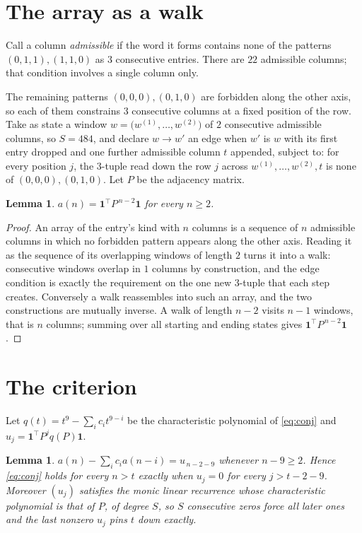 \documentclass[11pt,a4paper]{article}
\theoremstyle{plain}
\newtheorem{lemma}[theorem]{Lemma}
\theoremstyle{definition}
\begin{document}
\section{The array as a walk}

Call a column \emph{admissible} if the word it forms contains none of the patterns
$(0,1,1), (1,1,0)$ as $3$ consecutive entries. There are $22$ admissible columns; that condition
involves a single column only.

The remaining patterns $(0,0,0), (0,1,0)$ are forbidden along the other axis, so each of them
constrains $3$ consecutive columns at a fixed position of the row. Take as state a
window $w=\bigl(w^{(1)},\dots,w^{(2)}\bigr)$ of $2$ consecutive admissible
columns, so $S=484$, and declare $w\to w'$ an edge when $w'$ is $w$ with its first entry
dropped and one further admissible column $t$ appended, subject to: for every position
$j$, the $3$-tuple read down the row $j$ across $w^{(1)},\dots,w^{(2)},t$
is none of $(0,0,0), (0,1,0)$. Let $P$ be the adjacency matrix.

\begin{lemma}\label{lem:walk}
$a(n)=\mathbf{1}^{\!\top}P^{\,n-2}\mathbf{1}$ for every $n\ge2$.
\end{lemma}

\begin{proof}
An array of the entry's kind with $n$ columns is a sequence of $n$ admissible columns in
which no forbidden pattern appears along the other axis. Reading it as the sequence of its
overlapping windows of length $2$ turns it into a walk: consecutive windows overlap in
$1$ columns by construction, and the edge condition is exactly the requirement on the one
new $3$-tuple that each step creates. Conversely a walk reassembles into such an array,
and the two constructions are mutually inverse. A walk of length $n-2$ visits $n-1$
windows, that is $n$ columns; summing over all starting and ending states gives
$\mathbf{1}^{\!\top}P^{\,n-2}\mathbf{1}$.
\end{proof}

\section{The criterion}

Let $q(t)=t^{9}-\sum_i c_i t^{9-i}$ be the characteristic polynomial of
\eqref{eq:conj} and $u_j=\mathbf{1}^{\!\top}P^{j}q(P)\mathbf{1}$.

\begin{lemma}\label{lem:crit}
$a(n)-\sum_i c_i a(n-i)=u_{\,n-2-9}$ whenever $n-9\ge2$. Hence
\eqref{eq:conj} holds for every $n>t$ exactly when $u_j=0$ for every
$j>t-2-9$. Moreover $(u_j)$ satisfies the monic linear recurrence whose
characteristic polynomial is that of $P$, of degree $S$, so $S$ consecutive zeros force all
later ones and the last nonzero $u_j$ pins $t$ down exactly.
\end{lemma}
\end{document}

